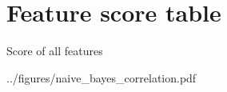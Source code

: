 
\section{Feature score table}%
\label{sub:full-table-feature}

\begin{table}[H]
    \centering
    \caption{Score of all features}%
    \label{tab:features-all}
    
\end{table}




 {../figures/naive_bayes_correlation.pdf}
